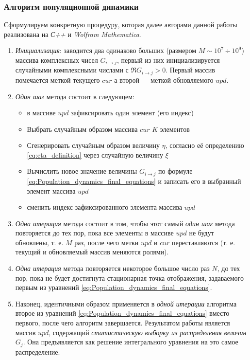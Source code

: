 \subsubsection{Алгоритм популяционной динамики}
Сформулируем конкретную процедуру, которая далее авторами данной работы реализована на \textit{С++} и \textit{Wolfram Mathematica}. 
\begin{enumerate}
	\item \textit{Инициализация}: заводится два одинаково больших (размером $M \sim 10^{7} \div 10^{9}$) массива комплексных чисел $G_{i \rightarrow j}$, первый из них инициализируется случайными комплексными числами с $\Re G_{i \rightarrow j} > 0$. Первый массив помечается меткой текущего $cur$ а второй --- меткой обновляемого $upd$.
	
	\item \textit{Один шаг} метода состоит в следующем:
		\begin{itemize}
			\item в массиве $upd$ зафиксировать один элемент (его индекс)
			\item Выбрать случайным образом массива $cur$ $K$ элементов
			\item Сгенерировать случайным образом величину $\eta$, согласно её определению \eqref{eq:eta_definition} через случайную величину $\xi$
			\item Вычислить новое значение величины $G_{i\rightarrow j}$ по формуле \eqref{eq:Population_dynamics_final_equations} и записать его в выбранный элемент массива $upd$
			\item сменить индекс зафиксированного элемента массива $upd$
		\end{itemize}
		
	\item \textit{Одна итерация} метода состоит в том, чтобы этот самый \textit{один шаг} метода повторяется до тех пор, пока все элементы в массиве $upd$ не будут обновлены, т. е. $M$ раз, после чего метки $upd$ и $cur$ переставляются (т. е. текущий и обновляемый массив меняются ролями).
	
	\item \textit{Одна итерация} метода повторяется некоторое большое число раз $N$, до тех пор, пока не будет достигнута стационарная точка отображения, задаваемого первым из уравнений \eqref{eq:Population_dynamics_final_equations}.
	
	\item Наконец, идентичными образом применяется в \textit{одной итерации} алгоритма второе из уравнений \eqref{eq:Population_dynamics_final_equations} вместо первого, после чего алгоритм завершается. Результатом работы является массив $upd$, содержащий \textit{статистическую выборку из распределения величин $G_j$}. Она предъявляется как решение интегрального уравнения на это самое распределение.
\end{enumerate}

